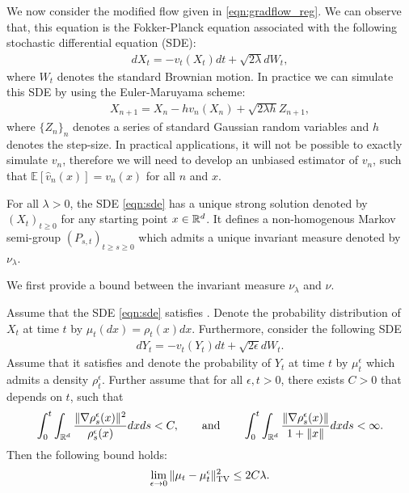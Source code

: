 We now consider the modified flow given in \eqref{eqn:gradflow_reg}. We can observe that, this equation is the Fokker-Planck equation associated with the following stochastic differential equation (SDE):
\begin{align}
d X_t = - v_t(X_t) dt + \sqrt{2 \lambda } d W_t, \label{eqn:sde}
\end{align}
where $W_t$ denotes the standard Brownian motion. In practice we can simulate this SDE by using the Euler-Maruyama scheme:
\begin{align}
X_{n+1} = X_n - h v_n(X_n) + \sqrt{2 \lambda h} Z_{n+1},
\end{align}
where $\{Z_n\}_{n}$ denotes a series of standard Gaussian random variables and $h$ denotes the step-size. In practical applications, it will not be possible to exactly simulate $v_n$, therefore we will need to develop an unbiased estimator of $v_n$, such that $\mathbb{E}[\hat{v}_n (x)] = v_n(x)$ for all $n$ and $x$.

\begin{assumption}
\label{asmp:sde_ergo}
For all $\lambda >0$, the SDE  \eqref{eqn:sde} has a unique strong solution denoted by $(X_t)_{t\geq 0}$ for any starting point $x \in \mathbb{R}^d$. It defines a non-homogenous Markov semi-group $(P_{s,t})_{t\geq s\geq 0}$ which admits a unique invariant measure denoted by $\nu_\lambda$. 
\end{assumption}



We first provide a bound between the invariant measure $\nu_\lambda$ and $\nu$.

\begin{prop}
\label{prop:dist_statmeas}
Assume that the SDE \eqref{eqn:sde} satisfies . Denote the probability distribution of $X_t$ at time $t$ by $\mu_t(dx) = \rho_t (x) dx$. Furthermore, consider the following SDE
\begin{align}
d Y_t = - v_t(Y_t) dt + \sqrt{2 \epsilon } d W_t. \label{eqn:sde_eps}
\end{align}
Assume that it satisfies  and denote the probability of $Y_t$ at time $t$ by $\mu^\epsilon_t$ which admits a density $\rho^\epsilon_t$. Further assume that for all $\epsilon,t>0$, there exists $C >0$ that depends on $t$, such that
\begin{align}
\int_{0}^t \int_{\mathbb{R}^d} \frac{\|\nabla \rho^\epsilon_s(x) \|^2}{\rho^\epsilon_s(x)} dx ds <C, \qquad \text{and} \qquad \int_{0}^t \int_{\mathbb{R}^d}  \frac{\|\nabla \rho^\epsilon_s(x)\|}{1+\|x\|} dx ds <\infty.
\end{align}
Then the following bound holds:
\begin{align}
\lim_{\epsilon \rightarrow 0} \| \mu_t - \mu^\epsilon_t \|_{\textnormal{TV}}^2 \leq 2 C \lambda.
\end{align}
\end{prop}

